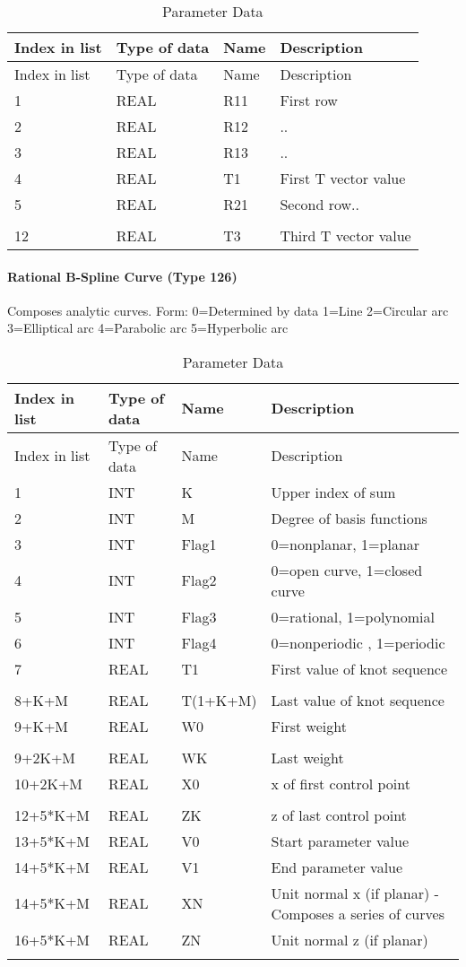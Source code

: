 \begin{longtable}[c]{@{}llll@{}}
\caption{Parameter Data}\tabularnewline
\toprule
Index in list & Type of data & Name & Description\tabularnewline
\midrule
\endfirsthead
\toprule
Index in list & Type of data & Name & Description\tabularnewline
\midrule
\endhead
1 & REAL & R11 & First row\tabularnewline
2 & REAL & R12 & ..\tabularnewline
3 & REAL & R13 & ..\tabularnewline
4 & REAL & T1 & First T vector value\tabularnewline
5 & REAL & R21 & Second row..\tabularnewline
\vtop{\hbox{\strut .}\hbox{\strut .}} &
\vtop{\hbox{\strut .}\hbox{\strut .}} &
\vtop{\hbox{\strut .}\hbox{\strut .}} &\tabularnewline
12 & REAL & T3 & Third T vector value\tabularnewline
\bottomrule
\end{longtable}

\paragraph{Rational B-Spline Curve (Type
126)}\label{rational-b-spline-curve-type-126}

Composes analytic curves. Form: 0=Determined by data 1=Line 2=Circular
arc 3=Elliptical arc 4=Parabolic arc 5=Hyperbolic arc

\begin{longtable}[c]{@{}llll@{}}
\caption{Parameter Data}\tabularnewline
\toprule
Index in list & Type of data & Name & Description\tabularnewline
\midrule
\endfirsthead
\toprule
Index in list & Type of data & Name & Description\tabularnewline
\midrule
\endhead
1 & INT & K & Upper index of sum\tabularnewline
2 & INT & M & Degree of basis functions\tabularnewline
3 & INT & Flag1 & 0=nonplanar, 1=planar\tabularnewline
4 & INT & Flag2 & 0=open curve, 1=closed curve\tabularnewline
5 & INT & Flag3 & 0=rational, 1=polynomial\tabularnewline
6 & INT & Flag4 & 0=nonperiodic , 1=periodic\tabularnewline
7 & REAL & T1 & First value of knot sequence\tabularnewline
\vtop{\hbox{\strut .}\hbox{\strut .}} &
\vtop{\hbox{\strut .}\hbox{\strut .}} &
\vtop{\hbox{\strut .}\hbox{\strut .}} &\tabularnewline
8+K+M & REAL & T(1+K+M) & Last value of knot sequence\tabularnewline
9+K+M & REAL & W0 & First weight\tabularnewline
\vtop{\hbox{\strut .}\hbox{\strut .}} &
\vtop{\hbox{\strut .}\hbox{\strut .}} &
\vtop{\hbox{\strut .}\hbox{\strut .}} &\tabularnewline
9+2K+M & REAL & WK & Last weight\tabularnewline
10+2K+M & REAL & X0 & x of first control point\tabularnewline
\vtop{\hbox{\strut .}\hbox{\strut .}} &
\vtop{\hbox{\strut .}\hbox{\strut .}} &
\vtop{\hbox{\strut .}\hbox{\strut .}} &\tabularnewline
12+5*K+M & REAL & ZK & z of last control point\tabularnewline
13+5*K+M & REAL & V0 & Start parameter value\tabularnewline
14+5*K+M & REAL & V1 & End parameter value\tabularnewline
14+5*K+M & REAL & XN & Unit normal x (if planar) \textbar{}-Composes a
series of curves\tabularnewline
16+5*K+M & REAL & ZN & Unit normal z (if planar)\tabularnewline
\tabularnewline
\bottomrule
\end{longtable}

